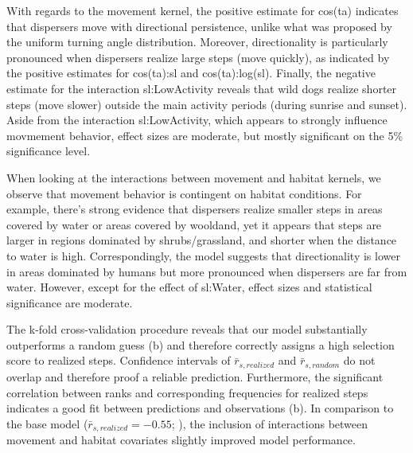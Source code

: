 \documentclass[abstract=on,10pt,a4paper,bibliography=totocnumbered]{article}
\begin{document}
With regards to the movement kernel, the positive estimate for \textsf{cos(ta)}
indicates that dispersers move with directional persistence, unlike what was
proposed by the uniform turning angle distribution. Moreover, directionality is
particularly pronounced when dispersers realize large steps (move quickly), as
indicated by the positive estimates for \textsf{cos(ta):sl} and
\textsf{cos(ta):log(sl)}. Finally, the negative estimate for the interaction
\textsf{sl:LowActivity} reveals that wild dogs realize shorter steps (move
slower) outside the main activity periods (during sunrise and sunset). Aside
from the interaction \textsf{sl:LowActivity}, which appears to strongly
influence movmement behavior, effect sizes are moderate, but mostly significant
on the 5\% significance level.

When looking at the interactions between movement and habitat kernels, we
observe that movement behavior is contingent on habitat conditions. For example,
there's strong evidence that dispersers realize smaller steps in areas covered
by water or areas covered by wooldand, yet it appears that steps are larger in
regions dominated by shrubs/grassland, and shorter when the distance to water is
high. Correspondingly, the model suggests that directionality is lower in areas
dominated by humans but more pronounced when dispersers are far from water.
However, except for the effect of \textsf{sl:Water}, effect sizes and
statistical significance are moderate.

The k-fold cross-validation procedure reveals that our model substantially
outperforms a random guess (b) and therefore correctly
assigns a high selection score to realized steps. Confidence intervals of
\(\bar{r}_{s, realized}\) and \(\bar{r}_{s, random}\) do not overlap and
therefore proof a reliable prediction. Furthermore, the significant correlation
between ranks and corresponding frequencies for realized steps indicates a good
fit between predictions and observations (b). In comparison
to the base model (\(\bar{r}_{s, realized} = -0.55\); \citealp{Hofmann.2021}),
the inclusion of interactions between movement and habitat covariates slightly
improved model performance.
\end{document}
